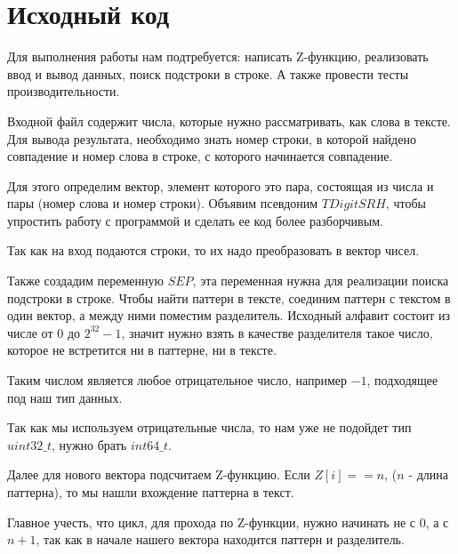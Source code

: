 \pagebreak

\section{Исходный код}

Для выполнения работы нам подтребуется: написать Z-функцию, реализовать ввод и вывод данных, поиск подстроки в строке.
А также провести тесты производительности.


Входной файл содержит числа, которые нужно рассматривать, как слова в тексте. Для вывода результата,
необходимо знать номер строки, в которой найдено совпадение и номер слова в строке, с которого начинается совпадение.

Для этого определим вектор, элемент которого это пара, состоящая из числа и пары (номер слова и номер строки).
Объявим псевдоним $TDigitSRH$, чтобы упростить работу с программой и сделать ее код более разборчивым.


Так как на вход подаются строки, то их надо преобразовать в вектор чисел.


Также создадим переменную $SEP$, эта переменная нужна для реализации поиска подстроки в строке.
Чтобы найти паттерн в тексте, соединим паттерн с текстом в один вектор, а между ними поместим разделитель.
Исходный алфавит состоит из числе от $0$ до $2^{32} - 1$, значит нужно взять в качестве разделителя такое число,
которое не встретится ни в паттерне, ни в тексте.

Таким числом является любое отрицательное число, например $-1$, подходящее под наш тип данных. 

Так как мы используем отрицательные числа,
то нам уже не подойдет тип $uint32\_t$, нужно брать $int64\_t$.


Далее для нового вектора подсчитаем Z-функцию. Если $Z[i] == n$, ($n$ - длина паттерна), то мы нашли вхождение
паттерна в текст. 

Главное учесть, что цикл, для прохода по Z-функции, нужно начинать не с $0$, а с $n + 1$, 
так как в начале нашего вектора находится паттерн и разделитель.



